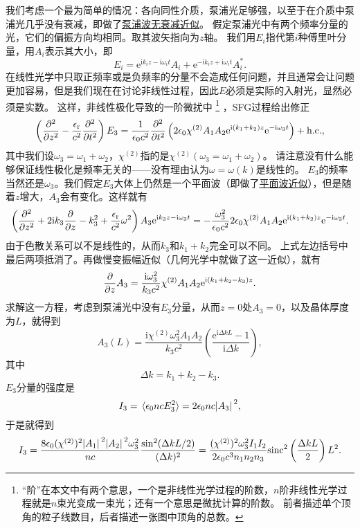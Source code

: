 \documentclass[UTF8, a4paper]{ctexart}
\newcommand*{\ee}{\mathrm{e}}
\newcommand*{\ii}{\mathrm{i}}
\newcommand{\concept}[1]{\underline{#1}}
\begin{document}
我们考虑一个最为简单的情况：各向同性介质，泵浦光足够强，以至于在介质中泵浦光几乎没有衰减，即做了\concept{泵浦波无衰减近似}。
假定泵浦光中有两个频率分量的光，它们的偏振方向均相同。取其波矢指向为$z$轴。
我们用$E_i$指代第$i$种傅里叶分量，用$A_i$表示其大小，即
\[
    E_i = \ee^{\ii k_i z - \ii \omega_i t} A_i + \ee^{- \ii k_i z + \ii \omega_i t} A_i^*.
\]
在线性光学中只取正频率或是负频率的分量不会造成任何问题，并且通常会让问题更加容易，但是我们现在在讨论非线性过程，因此$E$必须是实际的入射光，显然必须是实数。
这样，非线性极化导致的一阶微扰中%
\footnote{
    “阶”在本文中有两个意思，一个是非线性光学过程的阶数，$n$阶非线性光学过程就是$n$束光变成一束光；还有一个意思是微扰计算的阶数。
    前者描述单个顶角的粒子线数目，后者描述一张图中顶角的总数。
}%
，SFG过程给出修正
\[
    \left( \pdv[2]{z} - \frac{\epsilon_\text{r}}{c^2} \pdv[2]{t} \right) E_3 = \frac{1}{\epsilon_0 c^2} \pdv[2]{t} \left( 2 \epsilon_0  \chi^{(2)} A_1 A_2 \ee^{\ii (k_1 + k_2) z} \ee^{-\ii \omega_3 t} \right) + \text{h.c.},
\]
其中我们设$\omega_3 = \omega_1 + \omega_2$，$\chi^{(2)}$指的是$\chi^{(2)}(\omega_3=\omega_1+\omega_2)$。
请注意没有什么能够保证线性极化是频率无关的——没有理由认为$\omega=\omega(k)$是线性的。
$E_3$的频率当然还是$\omega_3$。我们假定$E_3$大体上仍然是一个平面波（即做了\concept{平面波近似}），但是随着$z$增大，$A_3$会有变化。这样就有
\[
    \left( \pdv[2]{z} + 2 \ii k_3 \pdv{z} - k_3^2 + \frac{\epsilon_\text{r}}{c^2} \omega^2 \right) A_3 \ee^{\ii k_3 z - \ii \omega_3 t} = - \frac{\omega_3^2}{\epsilon_0 c^2} 2 \epsilon_0  \chi^{(2)} A_1 A_2 \ee^{\ii (k_1 + k_2) z} \ee^{-\ii \omega_3 t} .
\]
由于色散关系可以不是线性的，从而$k_3$和$k_1 + k_2$完全可以不同。
上式左边括号中最后两项抵消了。再做慢变振幅近似（几何光学中就做了这一近似），就有
\[
    \pdv{z} A_3 = \frac{\ii \omega_3^2}{k_3 c^2} \chi^{(2)} A_1 A_2 \ee^{\ii (k_1 + k_2 - k_3) z}.
\]
求解这一方程，考虑到泵浦光中没有$E_3$分量，从而$z=0$处$A_3=0$，以及晶体厚度为$L$，就得到
\begin{equation}
    A_3(L) = \frac{\ii \chi^{(2)} \omega_3^2 A_1 A_2}{k_3 c^2} \left( \frac{\ee^{\ii \Delta k L} - 1}{\ii \Delta k} \right),
\end{equation}
其中
\begin{equation}
    \Delta k = k_1 + k_2 - k_3.
\end{equation}
$E_3$分量的强度是
\[
    I_3 = \expval*{\epsilon_0 n c E_3^2} = 2 \epsilon_0 n c \abs*{A_3}^2,
\]
于是就得到
\begin{equation}
    I_3 = \frac{8 \epsilon_0 (\chi^{(2)})^2 \abs*{A_1}^2 \abs*{A_2}^2 \omega_3^2}{nc} \frac{\sin^2(\Delta k L / 2)}{(\Delta k)^2} = \frac{(\chi^{(2)})^2 \omega_3^2 I_1 I_2}{2 \epsilon_0 c^3 n_1 n_2 n_3} \mathrm{sinc}^2 \left( \frac{\Delta k L}{2} \right) L^2.
    \label{eq:sfg-intensity}
\end{equation}
\end{document}
